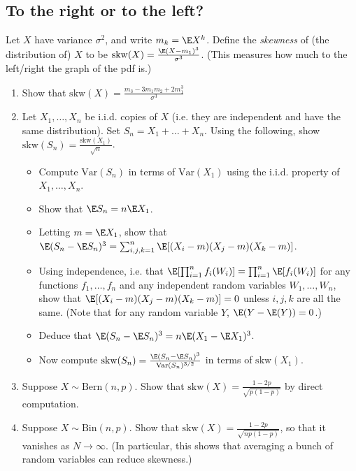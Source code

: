 \documentclass[12pt,reqno]{amsart}
\theoremstyle{definition}
\theoremstyle{remark}
\numberwithin{equation}{section}
\begin{document}
\subsection{To the right or to the left?}
Let $X$ have variance $\sigma^{2}$, and write $m_{k}=\E X^{k}$. Define the \emph{skewness} of (the distribution of) $X$ to be $\mathrm{skw}(X)=\frac{\E(X-m_{1})^{3}}{\sigma^{3}}$. (This measures how much to the left/right the graph of the pdf is.)
\begin{enumerate}
\item Show that $\mathrm{skw}(X)=\frac{m_{3}-3m_{1}m_{2}+2m_{1}^{3}}{\sigma^{3}}$
\item Let $X_{1},\ldots,X_{n}$ be i.i.d. copies of $X$ (i.e. they are independent and have the same distribution). Set $S_{n}=X_{1}+\ldots+X_{n}$. Using the following, show $\mathrm{skw}(S_{n})=\frac{\mathrm{skw}(X_{1})}{\sqrt{n}}$.
\begin{itemize}
\item Compute $\mathrm{Var}(S_{n})$ in terms of $\mathrm{Var}(X_{1})$ using the i.i.d. property of $X_{1},\ldots,X_{n}$.
\item Show that $\E S_{n}=n\E X_{1}$.
\item Letting $m=\E X_{1}$, show that $\E(S_{n}-\E S_{n})^{3}=\sum_{i,j,k=1}^{n}\E[(X_{i}-m)(X_{j}-m)(X_{k}-m)]$.
\item Using independence, i.e. that $\E[\prod_{i=1}^{n}f_{i}(W_{i})]=\prod_{i=1}^{n}\E[f_{i}(W_{i})]$ for any functions $f_{1},\ldots,f_{n}$ and any independent random variables $W_{1},\ldots,W_{n}$, show that $\E[(X_{i}-m)(X_{j}-m)(X_{k}-m)]=0$ unless $i,j,k$ are all the same. (Note that for any random variable $Y$, $\E(Y-\E(Y))=0$.)
\item Deduce that $\E(S_{n}-\E S_{n})^{3}=n\E(X_{1}-\E X_{1})^{3}$.
\item Now compute $\mathrm{skw}(S_{n})=\frac{\E(S_{n}-\E S_{n})^{3}}{\mathrm{Var}(S_{n})^{3/2}}$ in terms of $\mathrm{skw}(X_{1})$. 
\end{itemize}
\item Suppose $X\sim\mathrm{Bern}(n,p)$. Show that $\mathrm{skw}(X)=\frac{1-2p}{\sqrt{p(1-p)}}$ by direct computation.
\item Suppose $X\sim\mathrm{Bin}(n,p)$. Show that $\mathrm{skw}(X)=\frac{1-2p}{\sqrt{np(1-p)}}$, so that it vanishes as $N\to\infty$. (In particular, this shows that averaging a bunch of random variables can reduce skewness.)
\end{enumerate}
\end{document}
